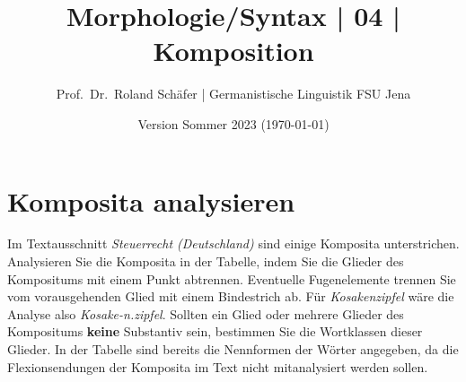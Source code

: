 \documentclass[12pt,a4paper,twoside]{article}
\author{Prof.\ Dr.\ Roland Schäfer | Germanistische Linguistik FSU Jena}
\title{Morphologie\slash Syntax | 04 | Komposition}
\date{Version Sommer 2023 (\today)}
\newcommand{\Zeile}{\vspace{\baselineskip}}
\begin{document}
\maketitle

\section{Komposita analysieren}\label{sec:analyse}

Im Textausschnitt \textit{Steuerrecht (Deutschland)} sind einige Komposita unterstrichen.
Analysieren Sie die Komposita in der Tabelle, indem Sie die Glieder des Kompositums mit einem Punkt abtrennen.
Eventuelle Fugenelemente trennen Sie vom vorausgehenden Glied mit einem Bindestrich ab.
Für \textit{Kosakenzipfel} wäre die Analyse also \textit{Kosake-n.zipfel}.
Sollten ein Glied oder mehrere Glieder des Kompositums \textbf{keine} Substantiv sein, bestimmen Sie die Wortklassen dieser Glieder.
In der Tabelle sind bereits die Nennformen der Wörter angegeben, da die Flexionsendungen der Komposita im Text nicht mitanalysiert werden sollen.

\Zeile
\end{document}
